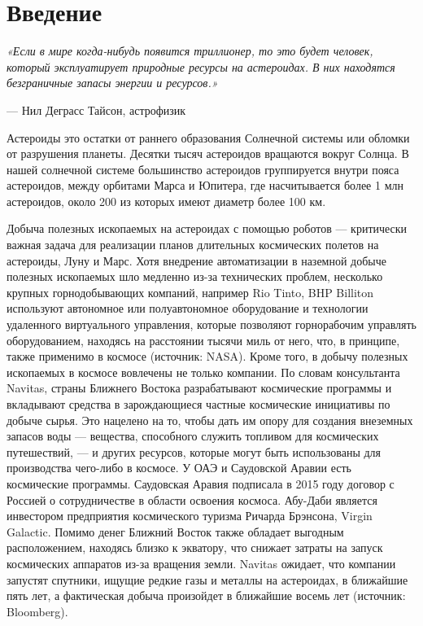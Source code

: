 \section{Введение}
\textit{«Если в мире когда-нибудь появится триллионер, то это будет человек, который эксплуатирует природные ресурсы на астероидах. В них находятся безграничные запасы энергии и ресурсов.» }

— Нил Деграсс Тайсон, астрофизик

Астероиды это остатки от раннего образования Солнечной системы или обломки от разрушения планеты. Десятки тысяч астероидов вращаются вокруг Солнца. В нашей солнечной системе большинство астероидов группируется внутри пояса астероидов, между орбитами Марса и Юпитера, где насчитывается более 1 млн астероидов, около 200 из которых имеют диаметр более 100 км.

Добыча полезных ископаемых на астероидах с помощью роботов — критически важная задача для реализации планов длительных космических полетов на астероиды, Луну и Марс. Хотя внедрение автоматизации в наземной добыче полезных ископаемых шло медленно из-за технических проблем, несколько крупных горнодобывающих компаний, например Rio Tinto, BHP Billiton используют автономное или полуавтономное оборудование и технологии удаленного виртуального управления, которые позволяют горнорабочим управлять оборудованием, находясь на расстоянии тысячи миль от него, что, в принципе, также применимо в космосе (источник: NASA). Кроме того, в добычу полезных ископаемых в космосе вовлечены не только компании. По словам консультанта Navitas, страны Ближнего Востока разрабатывают космические программы и вкладывают средства в зарождающиеся частные космические инициативы по добыче сырья. Это нацелено на то, чтобы дать им опору для создания внеземных запасов воды — вещества, способного служить топливом для космических путешествий, — и других ресурсов, которые могут быть использованы для производства чего-либо в космосе. У ОАЭ и Саудовской Аравии есть космические программы. Саудовская Аравия подписала в 2015 году договор с Россией о сотрудничестве в области освоения космоса. Абу-Даби является инвестором предприятия космического туризма Ричарда Брэнсона, Virgin Galactic. Помимо денег Ближний Восток также обладает выгодным расположением, находясь близко к экватору, что снижает затраты на запуск космических аппаратов из-за вращения земли. Navitas ожидает, что компании запустят спутники, ищущие редкие газы и металлы на астероидах, в ближайшие пять лет, а фактическая добыча произойдет в ближайшие восемь лет (источник: Bloomberg).

